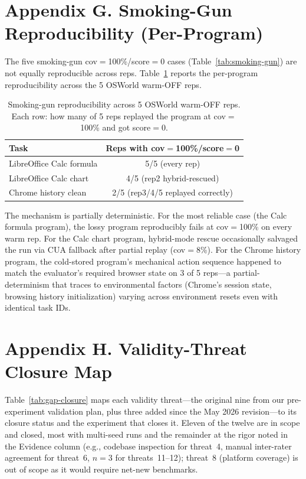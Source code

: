 \documentclass[11pt]{article}
\begin{document}
\section*{Appendix G. Smoking-Gun Reproducibility (Per-Program)}
\label{sec:appendix-smoking-gun-rep}

The five smoking-gun cov$=$100\%/score$=$0 cases (Table~\ref{tab:smoking-gun}) are not equally reproducible across reps. Table~\ref{tab:smoking-gun-rep} reports the per-program reproducibility across the 5 OSWorld warm-OFF reps.

\begin{table}[h]
\centering
\caption{Smoking-gun reproducibility across 5 OSWorld warm-OFF reps. Each row: how many of 5 reps replayed the program at cov$=$100\% and got score$=$0.}
\label{tab:smoking-gun-rep}
\small
\begin{tabular}{@{}lc@{}}
\toprule
Task & Reps with cov$=$100\%/score$=$0 \\
\midrule
LibreOffice Calc formula & 5/5 (every rep) \\
LibreOffice Calc chart & 4/5 (rep2 hybrid-rescued) \\
Chrome history clean & 2/5 (rep3/4/5 replayed correctly) \\
\bottomrule
\end{tabular}
\end{table}

The mechanism is partially deterministic. For the most reliable case (the Calc formula program), the lossy program reproducibly fails at cov$=$100\% on every warm rep. For the Calc chart program, hybrid-mode rescue occasionally salvaged the run via CUA fallback after partial replay (cov$=$8\%). For the Chrome history program, the cold-stored program's mechanical action sequence happened to match the evaluator's required browser state on 3 of 5 reps---a partial-determinism that traces to environmental factors (Chrome's session state, browsing history initialization) varying across environment resets even with identical task IDs.

\section*{Appendix H. Validity-Threat Closure Map}
\label{sec:appendix-threats}

Table~\ref{tab:gap-closure} maps each validity threat---the original nine from our pre-experiment validation plan, plus three added since the May 2026 revision---to its closure status and the experiment that closes it. Eleven of the twelve are in scope and closed, most with multi-seed runs and the remainder at the rigor noted in the Evidence column (e.g., codebase inspection for threat~4, manual inter-rater agreement for threat~6, $n{=}3$ for threats~11--12); threat~8 (platform coverage) is out of scope as it would require net-new benchmarks.
\end{document}

